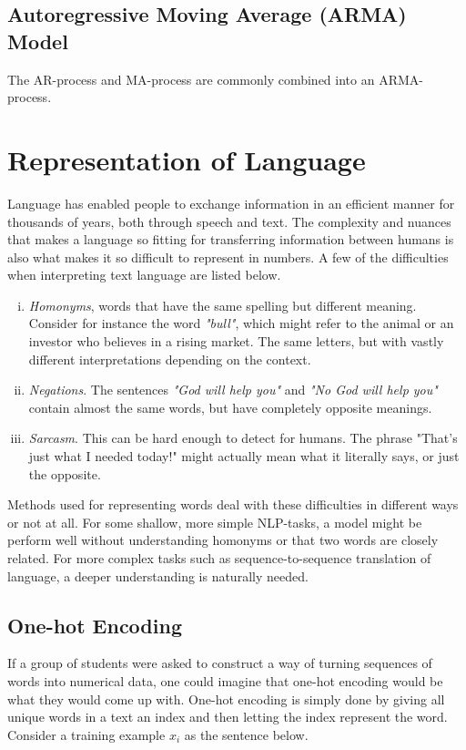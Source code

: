 \subsection{Autoregressive Moving Average (ARMA) Model}

The AR-process and MA-process are commonly combined into an ARMA-process. 

\section{Representation of Language}

Language has enabled people to exchange information in an efficient manner for thousands of years, both through speech and text. The complexity and nuances that makes a language so fitting for transferring information between humans is also what makes it so difficult to represent in numbers. A few of the difficulties when interpreting text language are listed below. 
\begin{enumerate}[i)]
    \item \textit{Homonyms}, words that have the same spelling but different meaning. Consider for instance the word \textit{"bull"}, which might refer to the animal or an investor who believes in a rising market. The same letters, but with vastly different interpretations depending on the context. 
    \item \textit{Negations}. The sentences \textit{"God will help you"} and \textit{"No God will help you"} contain almost the same words, but have completely opposite meanings. 
    \item \textit{Sarcasm}. This can be hard enough to detect for humans. The phrase "That's just what I needed today!" might actually mean what it literally says, or just the opposite.
\end{enumerate}

Methods used for representing words deal with these difficulties in different ways or not at all. For some shallow, more simple NLP-tasks, a model might be perform well without understanding homonyms or that two words are closely related. For more complex tasks such as sequence-to-sequence translation of language, a deeper understanding is naturally needed. 

\subsection{One-hot Encoding}

If a group of students were asked to construct a way of turning  sequences of words into numerical data, one could imagine that one-hot encoding would be what they would come up with. One-hot encoding is simply done by giving all unique words in a text an index and then letting the index represent the word. Consider a training example $x_i$ as the sentence below. 

